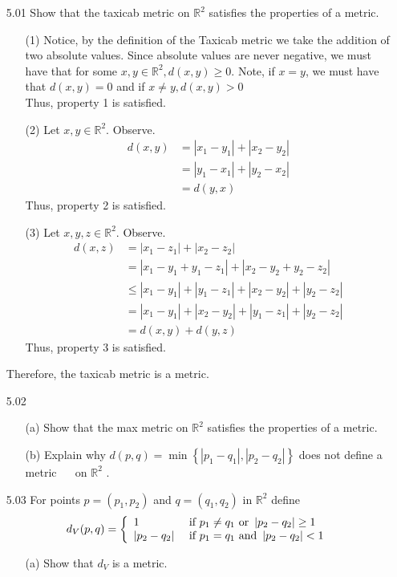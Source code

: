 \documentclass[12pt]{article}
\newcommand{\R}{\mathbb{R}}
\begin{document}
\pagestyle{fancy}  
\lfoot{} \cfoot{} \rfoot{}

\begin{enumerate}

	\item[5.01] Show that the taxicab metric on $\mathbb { R } ^ { 2 }$ satisfies the properties of a metric.
	\begin{enumerate}
		\item[(1)] Notice, by the definition of the Taxicab metric we take the addition of two absolute values. Since absolute values are never negative, we must have that for some $ x,y\in \R^2 , d(x,y)\geq 0$. Note, if $ x=y $, we must have that $ d(x,y)=0 $ and if $ x\not=y, d(x,y)>0 $\\
		Thus, property 1 is satisfied.
		\item[(2)] Let $ x,y\in \R^2 $. Observe.
		\begin{align*}
			d(x,y) &= |x_1-y_1|+|x_2-y_2|\\
				   &= |y_1-x_1|+|y_2-x_2|\\
				   &= d(y,x)
		\end{align*}
		Thus, property 2 is satisfied.
		\item[(3)] Let $ x,y,z \in \R^2 $. Observe.
			\begin{align*}
				d(x,z) &= |x_1-z_1|+|x_2-z_2|\\
					   &= |x_1-y_1+y_1-z_1|+|x_2-y_2+y_2-z_2|\\
					   &\leq |x_1-y_1|+|y_1-z_1|+|x_2-y_2|+|y_2-z_2|\\
					   &=    |x_1-y_1|+|x_2-y_2|+|y_1-z_1|+|y_2-z_2|\\
					   &= d(x,y)+d(y,z)
			\end{align*}
		Thus, property 3 is satisfied.
	\end{enumerate}
	Therefore, the taxicab metric is a metric.
	\item[5.02] 
	\begin{enumerate}
		\item[(a)] Show that the max metric on $\mathbb { R } ^ { 2 }$ satisfies the properties of a metric.	
		\item[(b)] Explain why $d ( p , q ) = \min \left\{ \left| p _ { 1 } - q _ { 1 } \right| , \left| p _ { 2 } - q _ { 2 } \right| \right\}$ does not define a metric $\quad$ on $\mathbb { R } ^ { 2 }$ .
	\end{enumerate}
	\item[5.03] For points $p = \left( p _ { 1 } , p _ { 2 } \right)$ and $q = \left( q _ { 1 } , q _ { 2 } \right)$ in $\mathbb { R } ^ { 2 }$ define
		\[d _ { V } ( p , q ) = \left\{ \begin{array} { l l } { 1 } & { \text { if } p _ { 1 } \neq q _ { 1 } \text { or } \left| p _ { 2 } - q _ { 2 } \right| \geq 1 } \\ { \left| p _ { 2 } - q _ { 2 } \right| } & { \text { if } p _ { 1 } = q _ { 1 } \text { and } \left| p _ { 2 } - q _ { 2 } \right| < 1 } \end{array} \right.\]
	\begin{enumerate}
		\item[(a)] Show that $d _ { V }$ is a metric.
	

\end{enumerate}
\end{enumerate}
\end{document}
